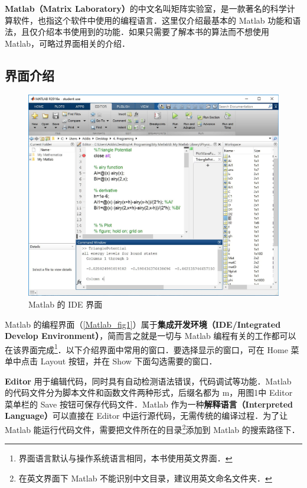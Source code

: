 
\textbf{Matlab（Matrix Laboratory）}的中文名叫矩阵实验室，是一款著名的科学计算软件，也指这个软件中使用的编程语言．这里仅介绍最基本的 Matlab 功能和语法，且仅介绍本书使用到的功能．如果只需要了解本书的算法而不想使用 Matlab，可略过界面相关的介绍．


\subsection{界面介绍}

\begin{figure}[ht]
\centering
\includegraphics[width= 14cm]{./figures/Matlab1.pdf}
\caption{Matlab 的 IDE 界面}\label{Matlab_fig1}
\end{figure}

Matlab 的编程界面（\autoref{Matlab_fig1}）属于\textbf{集成开发环境（IDE/Integrated Develop Environment）}，简而言之就是一切与 Matlab 编程有关的工作都可以在该界面完成\footnote{界面语言默认与操作系统语言相同，本书使用英文界面．}．以下介绍界面中常用的窗口．要选择显示的窗口，可在 Home 菜单中点击 Layout 按钮，并在 Show 下面勾选需要的窗口．

\textbf{Editor} 用于编辑代码，同时具有自动检测语法错误，代码调试等功能．Matlab 的代码文件分为脚本文件和函数文件两种形式，后缀名都为 m，用图1中 Editor 菜单栏的 Save 按钮可保存代码文件．Matlab 作为一种\textbf{解释语言（Interpreted Language）}可以直接在 Editor 中运行源代码，无需传统的编译过程．为了让 Matlab 能运行代码文件，需要把文件所在的目录\footnote{在英文界面下 Matlab 不能识别中文目录，建议用英文命名文件夹．}添加到 Matlab 的搜索路径下．

